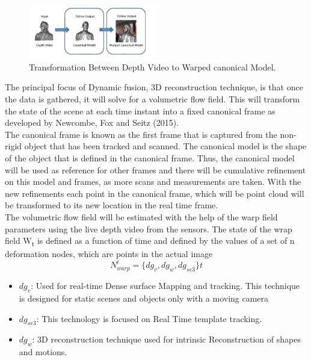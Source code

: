 \documentclass[12pt]{report}
\begin{document}
\begin{figure} %
    \centering
    \includegraphics[width=0.5\textwidth]{IMG_0073.png}
    \caption{Transformation Between Depth Video to Warped canonical Model. \cite[]{newcombe_fox_seitz_2015}}
\end{figure}
The principal focus of Dynamic fusion, 3D reconstruction technique, is that once the data is gathered, it will solve for a volumetric flow field. 
This will transform the state of the scene at each time instant into a fixed canonical frame as developed by Newcombe, Fox and Seitz (2015). \\[10pt]
The canonical frame is known as the first frame that is captured from the non-rigid object that has been tracked and scanned. The canonical model is the shape of the object that is defined in the canonical frame. 
Thus, the canonical model will be used as reference for other frames and there will be cumulative refinement on this model and frames, as more scans and  measurements are taken.
With the new refinements each point in the canonical frame, which will be point cloud will be transformed to its new location in the real time frame.\\[10pt]
The volumetric flow field will be estimated with the help of the warp field parameters using the live depth video from the sensors. 
The state of the wrap field W\textsubscript{t} is defined as a function of time and defined by the values of a set of n deformation nodes, which are points in the actual image
\[N_{warp}^t=\{dg_v,dg_w,dg_{se3}\}t\]
\begin{itemize}[label =]
    \item $dg_{v}$: Used for real-time Dense surface Mapping and tracking. This technique is designed for static scenes and objects only with a moving camera
    \item $dg_{se3}$: This technology is focused on Real Time template tracking.
    \item $dg_{w}$: 3D reconstruction technique used for intrinsic Reconstruction of shapes and motions. 
\end{itemize}
\end{document}
